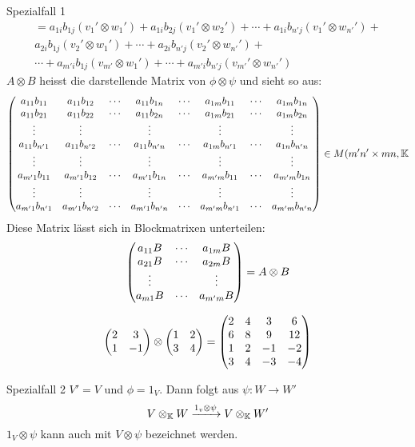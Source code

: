 \begin{Bem}{Spezialfall 1}
  \begin{gather*}
  =a_{1i}b_{1j}\left( v_1'\otimes w_1' \right)+a_{1i}b_{2j}\left( v_1'\otimes w_2' \right)+\cdots+a_{1i}b_{n'j}\left( v_1'\otimes w_{n'}' \right)+ \\
  a_{2i}b_{1j}\left( v_2'\otimes w_1' \right)+\cdots+a_{2i}b_{n'j}\left( v_2'\otimes w_{n'}'\right)+\\
  \cdots +a_{m'i}b_{1j}\left( v_{m'}\otimes w_1' \right)+\cdots +a_{m'i}b_{n'j}\left( v_{m'}'\otimes w_{n'}' \right)
  \end{gather*}
  $A\otimes B$ heisst die darstellende Matrix von $\phi\otimes\psi$ und sieht so aus:
  \[\begin{pmatrix}
  a_{11}b_{11}&a_{11}b_{12}&\cdots&a_{11}b_{1n}&\cdots& a_{1m}b_{11}&\cdots&a_{1m}b_{1n} \\
  a_{11}b_{21}&a_{11}b_{22}&\cdots&a_{11}b_{2n}&\cdots& a_{1m}b_{21}&\cdots&a_{1m}b_{2n}\\
  \vdots&\vdots& &\vdots& &\vdots& &\vdots \\
  a_{11}b_{n'1}&a_{11}b_{n'2}&\cdots&a_{11}b_{n'n}&\cdots&a_{1m}b_{n'1}&\cdots&a_{1n}b_{n'n} \\
  \vdots&\vdots& &\vdots& &\vdots& &\vdots \\
  a_{m'1}b_{11}&a_{m'1}b_{12}&\cdots&a_{m'1}b_{1n}&\cdots&a_{m'm}b_{11}&\cdots&a_{m'm}b_{1n} \\
  \vdots&\vdots& &\vdots& &\vdots& &\vdots \\
  a_{m'1}b_{n'1}&a_{m'1}b_{n'2}&\cdots&a_{m'1}b_{n'n}&\cdots&a_{m'm}b_{n'1}&\cdots&a_{m'm}b_{n'n} \end{pmatrix} \in M(m'n'\times mn,\mathbb{K}\]
  Diese Matrix lässt sich in Blockmatrixen unterteilen:
  \[\begin{pmatrix}
  a_{11}B&\cdots&a_{1m}B\\
  a_{21}B&\cdots&a_{2m}B\\
  \vdots& &\vdots\\
  a_{m1}B&\cdots&a_{m'm}B
  \end{pmatrix} = A\otimes B\]
\end{Bem}
\begin{Bsp}
  \[\begin{pmatrix}2&3\\1&-1\end{pmatrix}\otimes\begin{pmatrix}1&2\\3&4\end{pmatrix}=\begin{pmatrix}2&4&3&6\\6&8&9&12\\1&2&-1&-2\\3&4&-3&-4\end{pmatrix}\]
\end{Bsp}
\begin{Bem}{Spezialfall 2}
  $V'=V$ und $\phi=1_V$. Dann folgt aus $\psi:W\to W'$
  \[V\otimes_{\mathbb{K}}W\xrightarrow{1_v\otimes \psi}V\otimes_{\mathbb{K}}W'\]
  $1_V\otimes \psi$ kann auch mit $V\otimes \psi$ bezeichnet werden.
\end{Bem}
